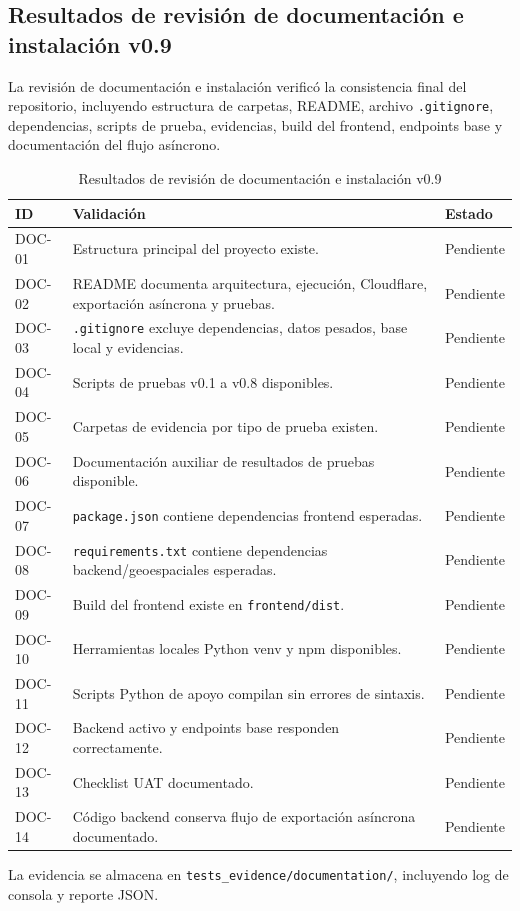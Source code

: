 
\subsection{Resultados de revisión de documentación e instalación v0.9}

La revisión de documentación e instalación verificó la consistencia final del repositorio,
incluyendo estructura de carpetas, README, archivo \texttt{.gitignore}, dependencias,
scripts de prueba, evidencias, build del frontend, endpoints base y documentación del
flujo asíncrono.

\begin{table}[H]
\centering
\begin{tabular}{|p{2.4cm}|p{8.6cm}|p{2.2cm}|}
\hline
\textbf{ID} & \textbf{Validación} & \textbf{Estado} \\
\hline
DOC-01 & Estructura principal del proyecto existe. & Pendiente \\
\hline
DOC-02 & README documenta arquitectura, ejecución, Cloudflare, exportación asíncrona y pruebas. & Pendiente \\
\hline
DOC-03 & \texttt{.gitignore} excluye dependencias, datos pesados, base local y evidencias. & Pendiente \\
\hline
DOC-04 & Scripts de pruebas v0.1 a v0.8 disponibles. & Pendiente \\
\hline
DOC-05 & Carpetas de evidencia por tipo de prueba existen. & Pendiente \\
\hline
DOC-06 & Documentación auxiliar de resultados de pruebas disponible. & Pendiente \\
\hline
DOC-07 & \texttt{package.json} contiene dependencias frontend esperadas. & Pendiente \\
\hline
DOC-08 & \texttt{requirements.txt} contiene dependencias backend/geoespaciales esperadas. & Pendiente \\
\hline
DOC-09 & Build del frontend existe en \texttt{frontend/dist}. & Pendiente \\
\hline
DOC-10 & Herramientas locales Python venv y npm disponibles. & Pendiente \\
\hline
DOC-11 & Scripts Python de apoyo compilan sin errores de sintaxis. & Pendiente \\
\hline
DOC-12 & Backend activo y endpoints base responden correctamente. & Pendiente \\
\hline
DOC-13 & Checklist UAT documentado. & Pendiente \\
\hline
DOC-14 & Código backend conserva flujo de exportación asíncrona documentado. & Pendiente \\
\hline
\end{tabular}
\caption{Resultados de revisión de documentación e instalación v0.9}
\end{table}

La evidencia se almacena en \texttt{tests\_evidence/documentation/}, incluyendo log de
consola y reporte JSON.
